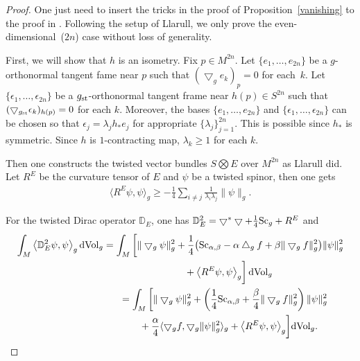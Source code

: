 \documentclass[10pt,a4paper]{amsart}
\begin{document}
\begin{proof}One just need to insert the tricks in the proof of Proposition~\ref{vanishing} to the proof in \cite[Theorem~4.1]{MR1600027}. Following the setup of Llarull, we only prove the even-dimensional~($2n$) case without loss of generality.

First, we will show that $h$ is an isometry. Fix $p\in M^{2n}$. Let $\{e_1,\dots, e_{2n}\}$ be a $g$-orthonormal tangent fame near $p$ such that $(\bigtriangledown_g e_k)_p=0$ for each~$k$. Let $\{\epsilon_1,\dots,\epsilon_{2n}\}$ be a $g_{\rm st}$-orthonormal tangent frame near $h(p)\in S^{2n}$ such that $(\bigtriangledown_{g_{\rm st}}\epsilon_k)_{h(p)}=0$ for each $k$. Moreover, the bases $\{e_1,\dots, e_{2n}\}$ and $\{\epsilon_1,\dots,\epsilon_{2n}\}$ can be chosen so that $\epsilon_j=\lambda_jh_*e_j$ for appropriate $\{\lambda_j\}_{j=1}^{2n}$. This is possible since $h_*$ is symmetric. Since $h$ is $1$-contracting map, $\lambda_k\geq 1$ for each $k$.

 Then one constructs the twisted vector bundles $S \bigotimes E$ over $M^{2n}$ as Llarull did. Let $R^E$ be the curvature tensor of $E$ and $\psi$ be a twisted spinor, then one gets
 \begin{gather*}
 \big\langle R^E\psi, \psi\big\rangle_g \geq -\frac{1}{4}\sum_{i\neq j}\frac{1}{\lambda_i\lambda_j}\|\psi\|_g.
\end{gather*}

For the twisted Dirac operator $\mathbb{D}_E$, one has $\mathbb{D}^2_E=\bigtriangledown^*\bigtriangledown + \frac{1}{4}{\rm Sc}_g + R^E$ and
\begin{gather*}
\int_M \big\langle \mathbb{D}^2_E \psi, \psi \big\rangle_g \,{\rm dVol}_g = \int_M \bigg[\|\bigtriangledown_g\psi\|^2_g + \frac{1}{4}\big({\rm Sc}_{\alpha, \beta} - \alpha \bigtriangleup_g f + \beta\|\bigtriangledown_gf\|^2_g\big)\|\psi\|^2_g \\
\hphantom{\int_M \big\langle \mathbb{D}^2_E \psi, \psi \big\rangle_g \,{\rm dVol}_g =}{} + \big\langle R^E\psi, \psi\big\rangle_g\bigg] \,{\rm dVol}_g\\
\hphantom{\int_M \big\langle \mathbb{D}^2_E \psi, \psi \big\rangle_g \,{\rm dVol}_g}{}
 = \int_M \bigg[\|\bigtriangledown_g\psi\|^2_g + \left(\frac{1}{4}{\rm Sc}_{\alpha, \beta} + \frac{\beta}{4}\|\bigtriangledown_g f\|^2_g\right)\|\psi\|^2_g \\
\hphantom{\int_M \big\langle \mathbb{D}^2_E \psi, \psi \big\rangle_g \,{\rm dVol}_g =}{}
 + \frac{\alpha}{4} \langle \bigtriangledown_gf, \bigtriangledown_g\|\psi\|^2_g\rangle_g + \big\langle R^E\psi, \psi\big\rangle_g\bigg] {\rm dVol}_g .
\end{gather*}


\end{proof}
\end{document}

